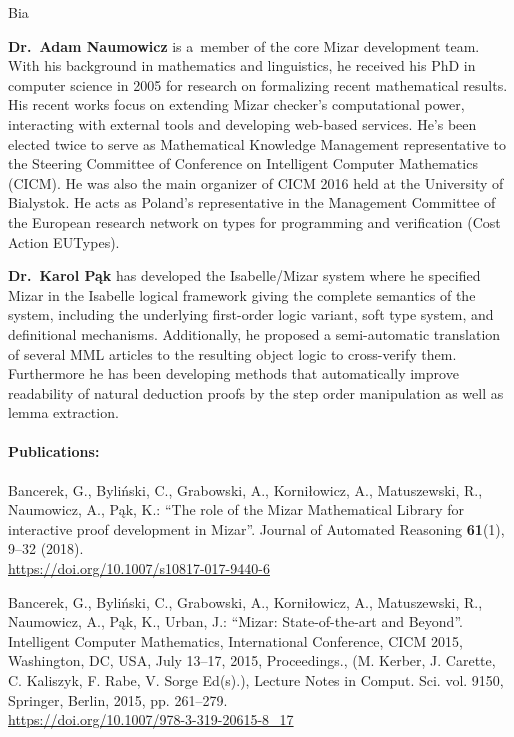 \begin{sitedescription}{Bia}
\begin{compactitem}
\item\textbf{Dr.\ Adam Naumowicz} is a~member of the core Mizar development team. 
With his background in mathematics and linguistics, he received his PhD in computer science in 2005
for research on formalizing recent mathematical results. His recent works focus on extending Mizar checker's computational power, 
interacting with external tools and developing web-based services. 
He's been elected twice to serve as Mathematical Knowledge Management representative to the Steering Committee
of Conference on Intelligent Computer Mathematics (CICM).
He was also the main organizer of CICM 2016 held at the University of Bialystok. 
He acts as Poland's representative in the Management Committee of the European research network on types for programming and verification (Cost Action EUTypes).

\item\textbf{Dr.\ Karol Pąk} has developed the Isabelle/Mizar system where
he specified Mizar in the Isabelle logical framework
giving the complete semantics of the system, including
the underlying first-order logic variant, soft type system, and definitional mechanisms.
Additionally, he proposed a semi-automatic translation of several MML articles
to the resulting object logic to cross-verify them.
Furthermore he has been developing methods
that automatically improve readability of natural deduction proofs
by the step order manipulation as well as lemma extraction.

\end{compactitem}

\paragraph{Publications:}

\begin{compactitem}

\item Bancerek, G., Byliński, C., Grabowski, A., Korniłowicz, A., Matuszewski, R., Naumowicz, A., Pąk, K.:
``The role of the {M}izar {M}athematical {L}ibrary for interactive proof development in {M}izar''.
Journal of Automated Reasoning \textbf{61}(1), 9--32 (2018).
\\\url{https://doi.org/10.1007/s10817-017-9440-6}

\item Bancerek, G., Byliński, C., Grabowski, A., Korniłowicz, A., Matuszewski, R., Naumowicz, A., Pąk, K., Urban, J.:
``Mizar: State-of-the-art and Beyond''.
Intelligent Computer Mathematics, International Conference, CICM 2015, Washington, DC, USA, July 13--17, 2015, Proceedings., (M. Kerber, J. Carette, C. Kaliszyk, F. Rabe, V. Sorge Ed(s).), Lecture Notes in Comput. Sci. vol. 9150, Springer, Berlin, 2015, pp. 261--279.
\\\url{https://doi.org/10.1007/978-3-319-20615-8_17}


\end{compactitem}
\end{sitedescription}
